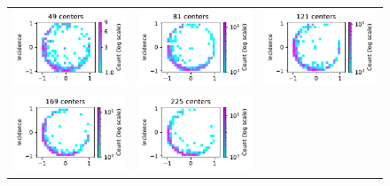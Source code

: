 \documentclass[12pt]{report} %
\begin{document}
\begin{figure}[h]
  \hspace*{-2cm}
  \begin{tabular}{ccc}
    {\includegraphics[width=.4\textwidth]{imagenes/experiments/2d/statistical_2d_full_scheduler_interpolation/parabola/distribution_of_errors_L_inf_end_C49.pdf}} &
    \includegraphics[width=.4\textwidth]{imagenes/experiments/2d/statistical_2d_full_scheduler_interpolation/parabola/distribution_of_errors_L_inf_end_C81.pdf}   &
    \includegraphics[width=.4\textwidth]{imagenes/experiments/2d/statistical_2d_full_scheduler_interpolation/parabola/distribution_of_errors_L_inf_end_C121.pdf}    \\
    \includegraphics[width=.4\textwidth]{imagenes/experiments/2d/statistical_2d_full_scheduler_interpolation/parabola/distribution_of_errors_L_inf_end_C169.pdf}  &
    \includegraphics[width=.4\textwidth]{imagenes/experiments/2d/statistical_2d_full_scheduler_interpolation/parabola/distribution_of_errors_L_inf_end_C225.pdf}  &

\end{tabular}
\end{figure}
\end{document}
